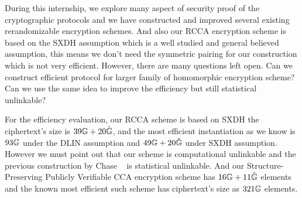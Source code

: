 During this internship, we explore many aspect of security proof of the cryptographic protocols
and we have constructed and improved several existing rerandomizable encryption schemes.
And also our RCCA encryption scheme is based on the SXDH assumption which is a well studied and general believed assumption,
this means we don't need the symmetric pairing for our construction which is not very efficient.
However, there are many questions left open. Can we construct efficient protocol for larger family of homomorphic encryption scheme?
Can we use the same idea to improve the efficiency but still statistical unlinkable?

For the efficiency evaluation,
our RCCA scheme is based on SXDH the ciphertext's size is $39\mathbb{G} + 20 \hat{\mathbb{G}}$,
and the most efficient instantiation as we know is $93\mathbb{G}$ under the DLIN assumption and $49\mathbb{G} + 20\hat{\mathbb{G}}$ under SXDH assumption.
However we must point out that our scheme is computational unlinkable and the previous construction by Chase \etal~\cite{DBLP:conf/eurocrypt/ChaseKLM12} is statistical unlinkable.
And our Structure-Preserving Publicly Verifiable CCA encryption scheme has $16 \mathbb{G} + 11 \hat{\mathbb{G}}$ elements and the known most efficient such scheme has ciphertext's size as $321\mathbb{G}$ elements.
